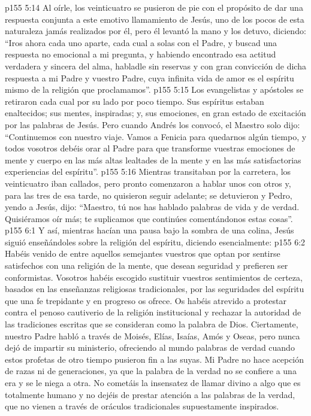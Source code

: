 \vs p155 5:14 Al oírle, los veinticuatro se pusieron de pie con el propósito de dar una respuesta conjunta a este emotivo llamamiento de Jesús, uno de los pocos de esta naturaleza jamás realizados por él, pero él levantó la mano y los detuvo, diciendo: “Iros ahora cada uno aparte, cada cual a solas con el Padre, y buscad una respuesta no emocional a mi pregunta, y habiendo encontrado esa actitud verdadera y sincera del alma, habladle sin reservas y con gran convicción de dicha respuesta a mi Padre y vuestro Padre, cuya infinita vida de amor es el espíritu mismo de la religión que proclamamos”.
\vs p155 5:15 Los evangelistas y apóstoles se retiraron cada cual por su lado por poco tiempo. Sus espíritus estaban enaltecidos; sus mentes, inspiradas; y, sus emociones, en gran estado de excitación por las palabras de Jesús. Pero cuando Andrés los convocó, el Maestro solo dijo: “Continuemos con nuestro viaje. Vamos a Fenicia para quedarnos algún tiempo, y todos vosotros debéis orar al Padre para que transforme vuestras emociones de mente y cuerpo en las más altas lealtades de la mente y en las más satisfactorias experiencias del espíritu”.
\vs p155 5:16 Mientras transitaban por la carretera, los veinticuatro iban callados, pero pronto comenzaron a hablar unos con otros y, para las tres de esa tarde, no quisieron seguir adelante; se detuvieron y Pedro, yendo a Jesús, dijo: “Maestro, tú nos has hablado palabras de vida y de verdad. Quisiéramos oír más; te suplicamos que continúes comentándonos estas cosas”.
\vs p155 6:1 Y así, mientras hacían una pausa bajo la sombra de una colina, Jesús siguió enseñándoles sobre la religión del espíritu, diciendo esencialmente:
\vs p155 6:2 \pc Habéis venido de entre aquellos semejantes vuestros que optan por sentirse satisfechos con una religión de la mente, que desean seguridad y prefieren ser conformistas. Vosotros habéis escogido sustituir vuestros sentimientos de certeza, basados en las enseñanzas religiosas tradicionales, por las seguridades del espíritu que una fe trepidante y en progreso os ofrece. Os habéis atrevido a protestar contra el penoso cautiverio de la religión institucional y rechazar la autoridad de las tradiciones escritas que se consideran como la palabra de Dios. Ciertamente, nuestro Padre habló a través de Moisés, Elías, Isaías, Amós y Oseas, pero nunca dejó de impartir su ministerio, ofreciendo al mundo palabras de verdad cuando estos profetas de otro tiempo pusieron fin a las suyas. Mi Padre no hace acepción de razas ni de generaciones, ya que la palabra de la verdad no se confiere a una era y se le niega a otra. No cometáis la insensatez de llamar divino a algo que es totalmente humano y no dejéis de prestar atención a las palabras de la verdad, que no vienen a través de oráculos tradicionales supuestamente inspirados.
